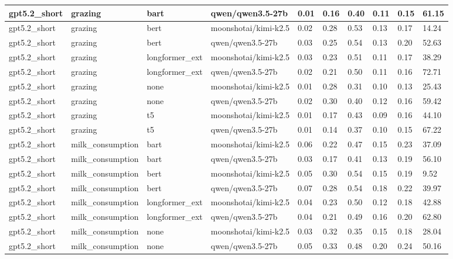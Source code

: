 \begin{tabular}{|l|l|l|l|l|l|l|l|l|l|}
 \hline
 gpt5.2\_short & grazing & bart & qwen/qwen3.5-27b & 0.01 & 0.16 & 0.40 & 0.11 & 0.15 & 61.15 \\
 \hline
 gpt5.2\_short & grazing & bert & moonshotai/kimi-k2.5 & 0.02 & 0.28 & 0.53 & 0.13 & 0.17 & 14.24 \\
 \hline
 gpt5.2\_short & grazing & bert & qwen/qwen3.5-27b & 0.03 & 0.25 & 0.54 & 0.13 & 0.20 & 52.63 \\
 \hline
 gpt5.2\_short & grazing & longformer\_ext & moonshotai/kimi-k2.5 & 0.03 & 0.23 & 0.51 & 0.11 & 0.17 & 38.29 \\
 \hline
 gpt5.2\_short & grazing & longformer\_ext & qwen/qwen3.5-27b & 0.02 & 0.21 & 0.50 & 0.11 & 0.16 & 72.71 \\
 \hline
 gpt5.2\_short & grazing & none & moonshotai/kimi-k2.5 & 0.01 & 0.28 & 0.31 & 0.10 & 0.13 & 25.43 \\
 \hline
 gpt5.2\_short & grazing & none & qwen/qwen3.5-27b & 0.02 & 0.30 & 0.40 & 0.12 & 0.16 & 59.42 \\
 \hline
 gpt5.2\_short & grazing & t5 & moonshotai/kimi-k2.5 & 0.01 & 0.17 & 0.43 & 0.09 & 0.16 & 44.10 \\
 \hline
 gpt5.2\_short & grazing & t5 & qwen/qwen3.5-27b & 0.01 & 0.14 & 0.37 & 0.10 & 0.15 & 67.22 \\
 \hline
 gpt5.2\_short & milk\_consumption & bart & moonshotai/kimi-k2.5 & 0.06 & 0.22 & 0.47 & 0.15 & 0.23 & 37.09 \\
 \hline
 gpt5.2\_short & milk\_consumption & bart & qwen/qwen3.5-27b & 0.03 & 0.17 & 0.41 & 0.13 & 0.19 & 56.10 \\
 \hline
 gpt5.2\_short & milk\_consumption & bert & moonshotai/kimi-k2.5 & 0.05 & 0.30 & 0.54 & 0.15 & 0.19 & 9.52 \\
 \hline
 gpt5.2\_short & milk\_consumption & bert & qwen/qwen3.5-27b & 0.07 & 0.28 & 0.54 & 0.18 & 0.22 & 39.97 \\
 \hline
 gpt5.2\_short & milk\_consumption & longformer\_ext & moonshotai/kimi-k2.5 & 0.04 & 0.23 & 0.50 & 0.12 & 0.18 & 42.88 \\
 \hline
 gpt5.2\_short & milk\_consumption & longformer\_ext & qwen/qwen3.5-27b & 0.04 & 0.21 & 0.49 & 0.16 & 0.20 & 62.80 \\
 \hline
 gpt5.2\_short & milk\_consumption & none & moonshotai/kimi-k2.5 & 0.03 & 0.32 & 0.35 & 0.15 & 0.18 & 28.04 \\
 \hline
 gpt5.2\_short & milk\_consumption & none & qwen/qwen3.5-27b & 0.05 & 0.33 & 0.48 & 0.20 & 0.24 & 50.16 \\

\end{tabular}
